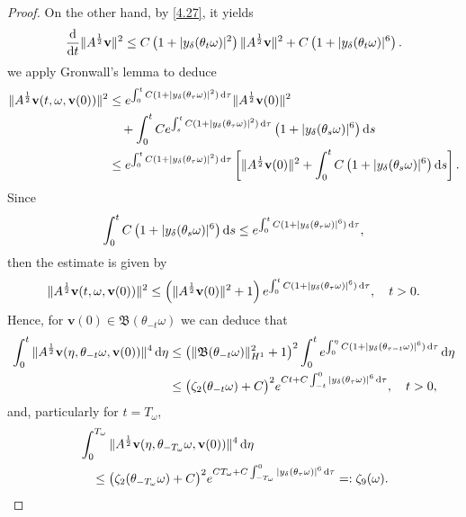 \documentclass{elsarticle}
\theoremstyle{definition}
\numberwithin{equation}{section}
\renewcommand{\d}{{\rm{d}}}
\begin{document}
\begin{proof}
On the other hand, by \eqref{4.27}, it yields
\begin{align*}
\frac{\d}{\d t}\|A^{\frac12}\textbf{v}\|^2 \leq C \left ( 1+ |y_\delta(\theta_t\omega)|^2 \right )\|A^{\frac12}\textbf{v}\|^2 + C \left (1 +|y_\delta(\theta_t\omega)|^6 \right) .
\end{align*}
we apply Gronwall's lemma to deduce
\begin{align*}
 \|A^{\frac 12} \textbf{v}(t,\omega, \textbf{v}(0))\|^2
  & \leq  e^{ \int^t_0 C(1+|y_\delta(\theta_\tau\omega)|^2) \, \d \tau} \|A^{\frac 12} \textbf{v}(0)\|^2  \\
 &\quad
 +\int_0^t Ce^{ \int^t_s C(1+|y_\delta(\theta_\tau\omega)|^2) \, \d \tau} \left (1+ |y_\delta(\theta_s\omega)|^6 \right)  \d s \\
 &\leq  e^{ \int^t_0 C(1+|y_\delta(\theta_\tau\omega)|^2) \, \d \tau} \left[ \|A^{\frac 12} \textbf{v}(0)\|^2
 +\int_0^t  C \left(1+ |y_\delta(\theta_s\omega)|^6 \right)  \d s \right]  .
\end{align*}
Since
\begin{align*}
\int_0^t  C \left (1+ |y_\delta(\theta_s\omega)|^6 \right)  \d s \leq e^{ \int^t_0 C(1+|y_\delta(\theta_\tau\omega)|^6) \, \d \tau},
\end{align*}
then the estimate is given by
\begin{align*}
 \|A^{\frac 12} \textbf{v}(t,\omega, \textbf{v}(0))\|^2
   \leq  \left( \|A^{\frac 12} \textbf{v}(0)\|^2 +1 \right) e^{ \int^t_0 C(1+|y_\delta(\theta_\tau\omega)|^6) \, \d \tau} ,
   \quad t>0.
\end{align*}
Hence,  for   $\textbf{v}(0) \in \mathfrak B(\theta_{-t}\omega)$ we can deduce that
 \begin{align*}
 \int_0^t
 \|A^{\frac 12} \textbf{v}(\eta, \theta_{-t} \omega, \textbf{v}(0))\|^4 \, \d \eta
 &   \leq  \left( \| \mathfrak B  (\theta_{-t}\omega)\|^2_{H^1} +1 \right)^2 \int_0^t e^{ \int^\eta_0 C(1+|y_\delta(\theta_{\tau-t} \omega)|^6) \, \d \tau}  \, \d \eta \nonumber \\
 &   \leq  \big( \zeta_2(\theta_{-t}\omega)  +C \big)^2  e^{ Ct+C \int^0_{-t}  |y_\delta(\theta_{\tau} \omega)|^6 \, \d \tau}   ,
   \quad t>0  , \nonumber
\end{align*}
and, particularly for $t=T_\omega$,
 \begin{align}  \label{mar11.3}
 & \int_0^{T_\omega}
 \|A^{\frac 12} \textbf{v}(\eta, \theta_{-{T_\omega}} \omega, \textbf{v}(0))\|^4 \, \d \eta \nonumber \\
 &   \quad  \leq  \big( \zeta_2(\theta_{-{T_\omega}}\omega)  +C \big)^2  e^{ C {T_\omega}+C \int^0_{-{T_\omega}}  |y_\delta(\theta_{\tau} \omega)|^6 \, \d \tau} =:\zeta_9(\omega).
\end{align}


\end{proof}
\end{document}
